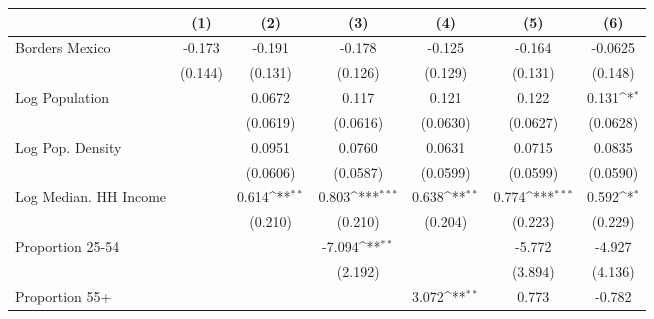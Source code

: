 {
\def\sym#1{\ifmmode^{#1}\else\(^{#1}\)\fi}
\begin{tabular}{l*{6}{c}}
\toprule
                    &\multicolumn{1}{c}{(1)}         &\multicolumn{1}{c}{(2)}         &\multicolumn{1}{c}{(3)}         &\multicolumn{1}{c}{(4)}         &\multicolumn{1}{c}{(5)}         &\multicolumn{1}{c}{(6)}         \\
\midrule
Borders Mexico      &      -0.173         &      -0.191         &      -0.178         &      -0.125         &      -0.164         &     -0.0625         \\
                    &     (0.144)         &     (0.131)         &     (0.126)         &     (0.129)         &     (0.131)         &     (0.148)         \\
\addlinespace
Log Population      &                     &      0.0672         &       0.117         &       0.121         &       0.122         &       0.131\sym{*}  \\
                    &                     &    (0.0619)         &    (0.0616)         &    (0.0630)         &    (0.0627)         &    (0.0628)         \\
\addlinespace
Log Pop. Density    &                     &      0.0951         &      0.0760         &      0.0631         &      0.0715         &      0.0835         \\
                    &                     &    (0.0606)         &    (0.0587)         &    (0.0599)         &    (0.0599)         &    (0.0590)         \\
\addlinespace
Log Median. HH Income&                     &       0.614\sym{**} &       0.803\sym{***}&       0.638\sym{**} &       0.774\sym{***}&       0.592\sym{*}  \\
                    &                     &     (0.210)         &     (0.210)         &     (0.204)         &     (0.223)         &     (0.229)         \\
\addlinespace
Proportion 25-54    &                     &                     &      -7.094\sym{**} &                     &      -5.772         &      -4.927         \\
                    &                     &                     &     (2.192)         &                     &     (3.894)         &     (4.136)         \\
\addlinespace
Proportion 55+      &                     &                     &                     &       3.072\sym{**} &       0.773         &      -0.782         \\

\end{tabular}}
